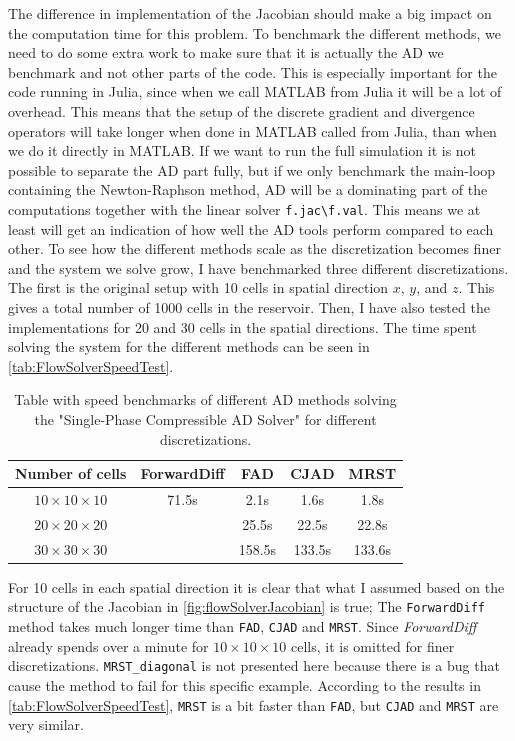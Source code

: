 The difference in implementation of the Jacobian should make a big impact on the computation time for this problem. To benchmark the different methods, we need to do some extra work to make sure that it is actually the AD we benchmark and not other parts of the code. This is especially important for the code running in Julia, since when we call MATLAB from Julia it will be a lot of overhead. This means that the setup of the discrete gradient and divergence operators will take longer when done in MATLAB called from Julia, than when we do it directly in MATLAB. If we want to run the full simulation it is not possible to separate the AD part fully, but if we only benchmark the main-loop containing the Newton-Raphson method, AD will be a dominating part of the computations together with the linear solver \texttt{f.jac\textbackslash f.val}. This means we at least will get an indication of how well the AD tools perform compared to each other. To see how the different methods scale as the discretization becomes finer and the system we solve grow, I have benchmarked three different discretizations. The first is the original setup with 10 cells in spatial direction $x$, $y$, and $z$. This gives a total number of 1000 cells in the reservoir. Then, I have also tested the implementations for 20 and 30 cells in the spatial directions. The time spent solving the system for the different methods can be seen in \autoref{tab:FlowSolverSpeedTest}.
\begin{table}[H]
    \centering
    \caption{Table with speed benchmarks of different AD methods solving the "Single-Phase Compressible AD Solver" for different discretizations.}
    \label{tab:FlowSolverSpeedTest}
    \def\arraystretch{1.5}
    \begin{tabular}{ccccc}
    \textbf{Number of cells} & \textbf{ForwardDiff} & \textbf{FAD} & \textbf{CJAD} & \textbf{MRST}\\
        \hline
         $10\times10\times10$ & 71.5s & 2.1s & 1.6s & 1.8s  \\  
         $20\times20\times20$ & ~ & 25.5s & 22.5s & 22.8s \\ 
         $30\times30\times30$ & ~ & 158.5s & 133.5s & 133.6s \\ \hline
    \end{tabular}
\end{table}
For 10 cells in each spatial direction it is clear that what I assumed based on the structure of the Jacobian in \autoref{fig:flowSolverJacobian} is true; The  \texttt{ForwardDiff} method takes much longer time than  \texttt{FAD}, \texttt{CJAD}  and \texttt{MRST}. Since  \textit{ForwardDiff} already spends over a minute for $10\times 10\times 10$ cells, it is omitted for finer discretizations. \texttt{MRST\_diagonal} is not presented here because there is a bug that cause the method to fail for this specific example.  According to the results in \autoref{tab:FlowSolverSpeedTest}, \texttt{MRST} is a bit faster than  \texttt{FAD}, but \texttt{CJAD} and \texttt{MRST} are very similar. 

